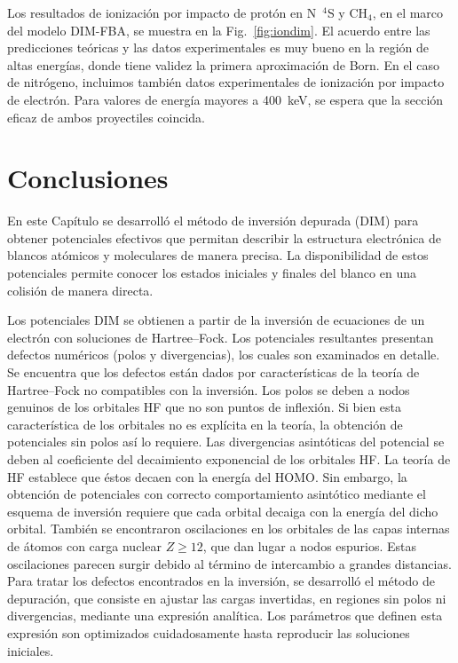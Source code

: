 {{{{Los resultados de ionización por impacto de protón en N~$^4$S y CH$_4$, 
en el marco del modelo DIM-FBA, se muestra en la Fig.~\ref{fig:iondim}. 
El acuerdo entre las predicciones teóricas y las datos experimentales es 
muy bueno en la región de altas energías, donde tiene validez la primera 
aproximación de Born. En el caso de nitrógeno, incluimos también datos 
experimentales de ionización por impacto de electrón. Para valores de 
energía mayores a 400~keV, se espera que la sección eficaz de ambos 
proyectiles coincida. 

\section{Conclusiones}
\label{conclusion}

En este Capítulo se desarrolló el método de inversión depurada (DIM) 
para obtener potenciales efectivos que permitan describir la estructura 
electrónica de blancos atómicos y moleculares de manera precisa. La 
disponibilidad de estos potenciales permite conocer los estados 
iniciales y finales del blanco en una colisión de manera directa. 

Los potenciales DIM se obtienen a partir de la inversión de ecuaciones 
de un electrón con soluciones de Hartree--Fock. Los potenciales 
resultantes presentan defectos numéricos (polos y divergencias), los 
cuales son examinados en detalle. Se encuentra que los defectos están 
dados por características de la teoría de Hartree--Fock no compatibles
con la inversión. Los polos se deben a nodos genuinos de los orbitales 
HF que no son puntos de inflexión. Si bien esta característica de los 
orbitales no es explícita en la teoría, la obtención de potenciales sin 
polos así lo requiere. Las divergencias asintóticas del potencial se 
deben al coeficiente del decaimiento exponencial de los orbitales HF. 
La teoría de HF establece que éstos decaen con la energía del HOMO. Sin 
embargo, la obtención de potenciales con correcto comportamiento 
asintótico mediante el esquema de inversión requiere que cada orbital 
decaiga con la energía del dicho orbital. También se encontraron 
oscilaciones en los orbitales de las capas internas de átomos con carga 
nuclear $Z\ge 12$, que dan lugar a nodos espurios. Estas oscilaciones 
parecen surgir debido al término de intercambio a grandes distancias. 
Para tratar los defectos encontrados en la inversión, se desarrolló el 
método de depuración, que consiste en ajustar las cargas invertidas, en 
regiones sin polos ni divergencias, mediante una expresión analítica. 
Los parámetros que definen esta expresión son optimizados cuidadosamente 
hasta reproducir las soluciones iniciales.

}}}}

